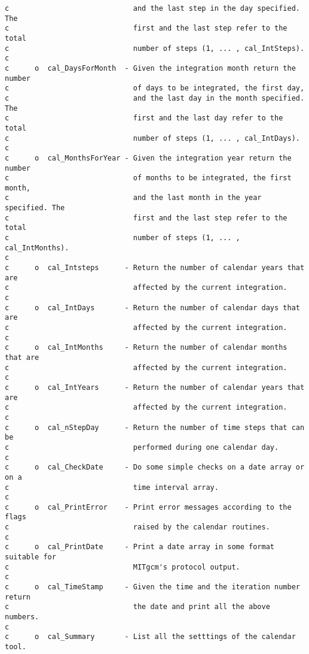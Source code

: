 {\begin{verbatim}
c                             and the last step in the day specified. The
c                             first and the last step refer to the total
c                             number of steps (1, ... , cal_IntSteps).
c
c      o  cal_DaysForMonth  - Given the integration month return the number
c                             of days to be integrated, the first day,
c                             and the last day in the month specified. The
c                             first and the last day refer to the total
c                             number of steps (1, ... , cal_IntDays).
c
c      o  cal_MonthsForYear - Given the integration year return the number
c                             of months to be integrated, the first month,
c                             and the last month in the year specified. The
c                             first and the last step refer to the total
c                             number of steps (1, ... , cal_IntMonths).
c
c      o  cal_Intsteps      - Return the number of calendar years that are
c                             affected by the current integration.
c
c      o  cal_IntDays       - Return the number of calendar days that are
c                             affected by the current integration.
c
c      o  cal_IntMonths     - Return the number of calendar months that are
c                             affected by the current integration.
c
c      o  cal_IntYears      - Return the number of calendar years that are
c                             affected by the current integration.
c
c      o  cal_nStepDay      - Return the number of time steps that can be
c                             performed during one calendar day.
c
c      o  cal_CheckDate     - Do some simple checks on a date array or on a
c                             time interval array.
c
c      o  cal_PrintError    - Print error messages according to the flags
c                             raised by the calendar routines.
c
c      o  cal_PrintDate     - Print a date array in some format suitable for
c                             MITgcm's protocol output.
c
c      o  cal_TimeStamp     - Given the time and the iteration number return
c                             the date and print all the above numbers.
c
c      o  cal_Summary       - List all the setttings of the calendar tool.
\end{verbatim}
}

